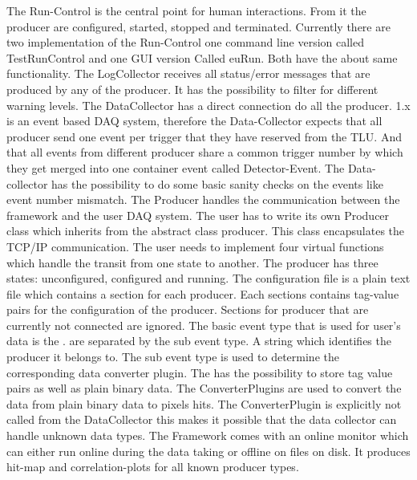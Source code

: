The Run-Control is the central point for human interactions. 
From it the producer are configured, started, stopped and terminated. 
Currently there are two implementation of the Run-Control one command line version called TestRunControl and one GUI version Called euRun. 
Both have the about same functionality. 
The LogCollector receives all status/error messages that are produced by any of the producer. 
It has the possibility to filter for different warning levels. 
The DataCollector has a direct connection do all the producer. 
\eudaq 1.x is an event based DAQ system, therefore the Data-Collector expects that all producer send one event per trigger that they have reserved from the TLU. 
And that all events from different producer share a common trigger number by which they get merged into one container event called Detector-Event. 
The Data-collector has the possibility to do some basic sanity checks on the events like event number mismatch. 
The Producer handles the communication between the \eudaq framework and the user DAQ system. 
The user has to write its own Producer class which inherits from the abstract class producer. 
This class encapsulates the TCP/IP communication. 
The user needs to implement four virtual functions which handle the transit from one state to another. 
The producer has three states: unconfigured, configured and running. 
The configuration file is a plain text file which contains a section for each producer. 
Each sections contains tag-value pairs for the configuration of the producer. 
Sections for producer that are currently not connected are ignored. 
The basic event type that is used for user's data is the \rawdataevent. 
\rawdataevents are separated by the sub event type. 
A string which identifies the producer it belongs to. 
The sub event type is used to determine the corresponding data converter plugin. 
The \rawdataevent has the possibility to store tag value pairs as well as plain binary data. 
The ConverterPlugins are used to convert the data from plain binary data to pixels hits. 
The ConverterPlugin is explicitly not called from the DataCollector this makes it possible that the data collector can handle unknown data types. 
The \eudaq Framework comes with an online monitor which can either run online during the data taking or offline on files on disk. 
It produces hit-map and correlation-plots for all known producer types. 
